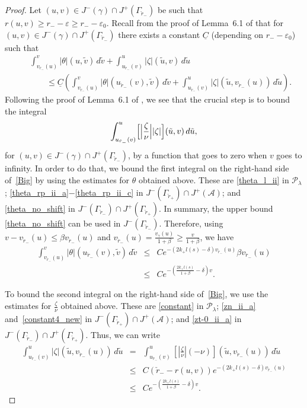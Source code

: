 \documentclass[a4paper,11pt,oneside,reqno]{amsart}
\newcommand{\kk}{k_+}
\newcommand{\cal}{\mathcal}
\newcommand{\eps}{\varepsilon}
\newcommand{\ckrm}{\check r_-}
\newcommand{\ckrp}{\check r_+}
\newcommand{\vgr}{v_{\ckrm}}
\newcommand{\ugr}{u_{\ckrm}}
\newcommand{\gam}{\gamma}
\newcommand{\vgam}{v_{\gam}}
\begin{document}
\begin{proof}
Let $(u,v)\in J^-(\gamma)\cap J^+(\Gamma_{\ckrm})$ be such that
$r(u,v)\geq r_--\eps\geq r_--\eps_0$.
Recall from the proof of Lemma~6.1 of \cite{relIst2} that for 
$(u,v)\in J^-(\gamma)\cap J^+(\Gamma_{\ckrm})$ there exists a constant $\underline C$ 
(depending on $r_--\eps_0$) such that 
\begin{eqnarray}
&&\int_{\vgr(u)}^v|\theta|(u,\tilde v)\,d\tilde v+\int_{\ugr(v)}^u|\zeta|(\tilde u,v)\,d\tilde u\label{Big}\\
&&\qquad\leq\underline C\left(
\int_{\vgr(u)}^v|\theta|(\ugr(v),\tilde v)\,d\tilde v+\int_{\ugr(v)}^u|\zeta|(\tilde u,\vgr(u))\,d\tilde u
\right).\nonumber
\end{eqnarray}
Following the proof of Lemma~6.1 of \cite{relIst2},
we see that the crucial step is to bound the integral
$$
\int_{\ugr(v)}^u\Bigl[\Bigl|\frac\zeta\nu\Bigr||\zeta|\Bigr](\tilde u,v)\,d\tilde u,
$$
for $(u,v)\in J^-(\gamma)\cap J^+(\Gamma_{\ckrm})$,
by a function that goes to zero when $v$ goes to infinity. In order to do that, 
we bound the first integral on the right-hand side of~\eqref{Big} by 
using the estimates for $\theta$ obtained above.
These are \eqref{theta_l_ii} in ${\cal P}_\lambda$;
\eqref{theta_rp_ii_a}$-$\eqref{theta_rp_ii_c} in $J^-(\Gamma_{\ckrp})\cap J^+({\cal A})$;
and \eqref{theta_no_shift} in $J^-(\Gamma_{\ckrm})\cap J^+(\Gamma_{\ckrp})$.
In summary, the upper bound \eqref{theta_no_shift} can be used in $J^-(\Gamma_{\ckrm})$.
Therefore, using  $v-\vgr(u)\leq \beta\vgr(u)$ and $\vgr(u)=\frac{\vgam(u)}{1+\beta}\geq\frac{v}{1+\beta}$,
we have
\begin{eqnarray*}
\int_{\vgr(u)}^v|\theta|(\ugr(v),\tilde v)\,d\tilde v
&\leq&Ce^{-\left(2\kk l(s)-\delta\right)\vgr(u)}\beta\vgr(u)\\
&\leq&Ce^{-\left(\frac{2\kk l(s)}{1+\beta}-\delta\right)v}.
\end{eqnarray*}

To bound the second integral on the right-hand side of~\eqref{Big},
we use the estimates for $\frac{\zeta}{\nu}$ obtained above.
These are \eqref{constant} in ${\cal P}_\lambda$;
\eqref{zn_ii_a} and~\eqref{constant4_new}
in $J^-(\Gamma_{\ckrp})\cap J^+({\cal A})$;
and \eqref{zt-0_ii_a} in $J^-(\Gamma_{\ckrm})\cap J^+(\Gamma_{\ckrp})$. 
Thus, we can write
\begin{eqnarray*}
\int_{\ugr(v)}^u|\zeta|(\tilde u,\vgr(u))\,d\tilde u
&=&\int_{\ugr(v)}^u\left[\left|\frac{\zeta}{\nu}\right|(-\nu)\right](\tilde u,\vgr(u))\,d\tilde u\\
&\leq&C(\ckrm-r(u,v))e^{-(2\kk l(s)-\delta)\vgr(u)}\\
&\leq&Ce^{-\left(\frac{2\kk l(s)}{1+\beta}-\delta\right)v}.
\end{eqnarray*}


\end{proof}
\end{document}
